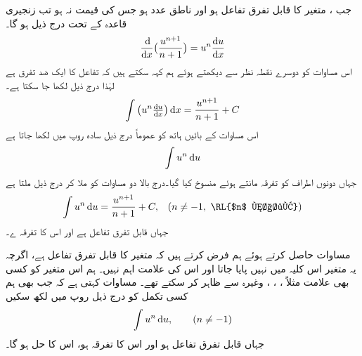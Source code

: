 جب ، متغیر  کا قابل تفرق تفاعل ہو اور  ناطق عدد ہو جس کی قیمت  نہ ہو تب زنجیری قاعدہ کے تحت درج ذیل ہو گا۔
\begin{align*}
\frac{\dif}{\dif x}\big(\frac{u^{n+1}}{n+1}\big)=u^n\frac{\dif u}{\dif x}
\end{align*}
اس مساوات کو دوسرے نقطہ نظر سے دیکھتے ہوئے ہم کہہ سکتے ہیں کہ تفاعل  کا ایک ضد تفرق  ہے لہٰذا درج ذیل لکھا جا سکتا ہے۔
\begin{align*}
\int \big(u^n\tfrac{\dif u}{\dif x}\big)\dif x=\frac{u^{n+1}}{n+1}+C
\end{align*}
اس مساوات کے بائیں ہاتھ کو عموماً درج ذیل سادہ   روپ میں لکھا جاتا ہے
\begin{align*}
\int u^n\dif u
\end{align*}
جہاں دونوں اطراف    کو  تفرقہ    مانتے ہوئے  منسوخ کیا گیا۔درج بالا دو مساوات کو ملا کر درج ذیل ملتا ہے
\begin{align}\label{مساوات_تکمل_پہلا_کلیہ}
\int u^n\dif u=\frac{u^{n+1}}{n+1}+C,&&(n\ne -1, \,\, \text{\RL{$n$ ناطق}})
\end{align}
جہاں  قابل تفرق تفاعل ہے اور  اس کا تفرقہ  ے۔

مساوات  حاصل کرتے ہوئے ہم فرض کرتے ہیں کہ  متغیر  کا قابل تفرق تفاعل ہے، اگرچہ یہ متغیر اس کلیہ میں نہیں پایا جاتا اور اس کی علامت اہم نہیں۔ ہم اس متغیر کو کسی بھی علامت مثلاً ، ، ، وغیرہ سے ظاہر کر سکتے تھے۔ مساوات  کہتی ہے کہ جب بھی ہم کسی تکمل کو درج ذیل روپ میں لکھ سکیں
\begin{align*}
\int u^n\dif u,\quad \quad (n\ne -1)
\end{align*}
جہاں  قابل تفرق تفاعل ہو اور  اس کا تفرقہ  ہو، اس کا حل  ہو گا۔

